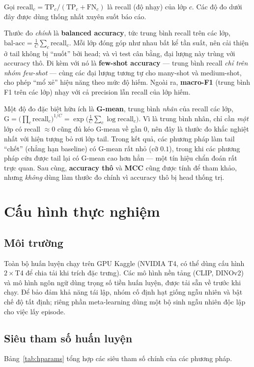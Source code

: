 Gọi $\text{recall}_c = \text{TP}_c/(\text{TP}_c+\text{FN}_c)$ là recall (độ nhạy) của lớp $c$. Các
độ đo dưới đây được dùng thống nhất xuyên suốt báo cáo.

Thước đo \emph{chính} là \textbf{balanced accuracy}, tức trung bình recall trên các lớp,
$\text{bal-acc}=\frac{1}{C}\sum_{c}\text{recall}_c$. Mỗi lớp đóng góp như nhau bất kể tần suất, nên
cải thiện ở tail không bị ``nuốt'' bởi head; và vì test cân bằng, đại lượng này trùng với accuracy
thô. Đi kèm với nó là \textbf{few-shot accuracy} --- trung bình recall \emph{chỉ trên nhóm
few-shot} --- cùng các đại lượng tương tự cho many-shot và medium-shot, cho phép ``mổ xẻ'' hiệu năng
theo mức độ hiếm. Ngoài ra, \textbf{macro-F1} (trung bình F1 trên các lớp) nhạy với cả precision lẫn
recall của lớp hiếm.

Một độ đo đặc biệt hữu ích là \textbf{G-mean}, trung bình \emph{nhân} của recall các lớp,
$\text{G}=\big(\prod_c \text{recall}_c\big)^{1/C}=\exp\!\big(\frac{1}{C}\sum_c\log\text{recall}_c\big)$.
Vì là trung bình nhân, chỉ cần \emph{một} lớp có recall $\approx 0$ cũng đủ kéo G-mean về gần $0$,
nên đây là thước đo khắc nghiệt nhất với hiện tượng bỏ rơi lớp tail. Trong kết quả, các phương pháp
làm tail ``chết'' (chẳng hạn baseline) có G-mean rất nhỏ (cỡ $0.1$), trong khi các phương pháp cứu
được tail lại có G-mean cao hơn hẳn --- một tín hiệu chẩn đoán rất trực quan. Sau cùng, \textbf{accuracy
thô} và \textbf{MCC} cũng được tính để tham khảo, nhưng \emph{không} dùng làm thước đo chính vì
accuracy thô bị head thống trị.

\section{Cấu hình thực nghiệm}

\subsection{Môi trường}
Toàn bộ huấn luyện chạy trên GPU Kaggle (NVIDIA T4, có thể dùng cấu hình $2\times$T4 để chia tải khi
trích đặc trưng). Các mô hình nền tảng (CLIP, DINOv2) và mô hình ngôn ngữ dùng trọng số tiền huấn
luyện, được tải sẵn về trước khi chạy. Để bảo đảm khả năng tái lập, nhóm cố định hạt giống ngẫu
nhiên và bật chế độ tất định; riêng phần meta-learning dùng một bộ sinh ngẫu nhiên độc lập cho việc
lấy episode.

\subsection{Siêu tham số huấn luyện}
Bảng~\ref{tab:hparams} tổng hợp các siêu tham số chính của các phương pháp.

